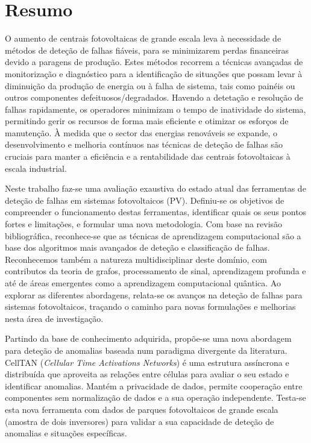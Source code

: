 \chapter*{Resumo}

O aumento de centrais fotovoltaicas de grande escala leva à necessidade de métodos de deteção de falhas fiáveis, para se minimizarem perdas financeiras devido a paragens de produção. Estes métodos recorrem a técnicas avançadas de monitorização e diagnóstico para a identificação de situações que possam levar à diminuição da produção de energia ou à falha de sistema, tais como painéis ou outros componentes defeituosos/degradados. Havendo a detetação e resolução de falhas rapidamente, os operadores minimizam o tempo de inatividade do sistema, permitindo gerir os recursos de forma mais eficiente e otimizar os esforços de manutenção. À medida que o sector das energias renováveis se expande, o desenvolvimento e melhoria contínuos nas técnicas de deteção de falhas são cruciais para manter a eficiência e a rentabilidade das centrais fotovoltaicas à escala industrial.

Neste trabalho faz-se uma avaliação exaustiva do estado atual das ferramentas de deteção de falhas em sistemas fotovoltaicos (PV). Definiu-se os objetivos de compreender o funcionamento destas ferramentas, identificar quais os seus pontos fortes e limitações, e formular uma nova metodologia. Com base na revisão bibliográfica, reconhece-se que as técnicas de aprendizagem computacional são a base dos algoritmos mais avançados de deteção e classificação de falhas. Reconhecemos também a natureza multidisciplinar deste domínio, com contributos da teoria de grafos, processamento de sinal, aprendizagem profunda e até de áreas emergentes como a aprendizagem computacional quântica. Ao explorar as diferentes abordagens, relata-se os avanços na deteção de falhas para sistemas fotovoltaicos, traçando o caminho para novas formulações e melhorias nesta área de investigação.

Partindo da base de conhecimento adquirida, propõe-se uma nova abordagem para deteção de anomalias baseada num paradigma divergente da literatura. CellTAN (\textit{Cellular Time Activations Networks}) é uma estrutura assíncrona e distribuída que aproveita as relações entre células para avaliar o seu estado e identificar anomalias. Mantém a privacidade de dados, permite cooperação entre componentes sem normalização de dados e a sua operação independente.
Testa-se esta nova ferramenta com dados de parques fotovoltaicos de grande escala (amostra de dois inversores) para validar a sua capacidade de deteção de anomalias e situações específicas.

